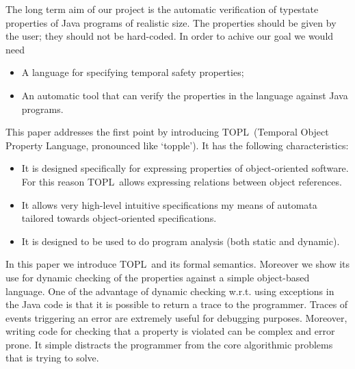 \documentclass[preprint]{sigplanconf} %
\newcommand{\note}[2]{\textcolor{gray}{[\textcolor{red}{#1}: #2]}}
\newcommand{\rg}[1]{\note{rg}{#1}}
\newcommand{\TPL}{TOPL}
\theoremstyle{definition}
\theoremstyle{remark}
\begin{document}
The long term aim of our project is the automatic verification of typestate properties of Java programs of realistic size.  
The properties should be given by the user; they should not be hard-coded.
In order to achive our goal we would need
\begin{itemize}
\item A language for specifying temporal safety properties;
\item An automatic tool that can verify the properties in the language against Java programs.
\end{itemize}
This paper addresses the first point by introducing \TPL  \ (Temporal Object Property Language, pronounced like `topple').
It has the following characteristics:
\begin{itemize}
\item It is designed specifically for expressing properties of object-oriented software. For this reason \TPL \ allows expressing relations between object references.
\item It allows very high-level intuitive specifications my means of automata tailored towards object-oriented specifications.
\item It is designed to be used to do program analysis (both static and dynamic).
\end{itemize}  
In this paper we introduce \TPL \ and its formal semantics. 
Moreover we show its use for dynamic checking of the properties against  a simple object-based language. 
One of the advantage of dynamic checking w.r.t. using exceptions in the Java code is that it is possible to return a trace to the programmer. 
Traces of events triggering an error are extremely useful for debugging purposes.
Moreover, writing code for checking that a property is violated can be complex and error prone. It simple distracts the programmer from the core algorithmic problems that is trying to solve.




\end{document}
